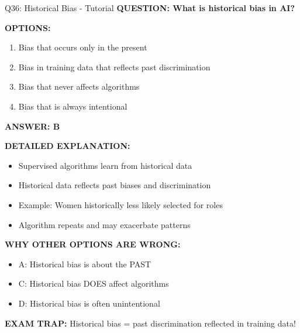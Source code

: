\documentclass[8pt]{beamer}
\begin{document}
	\begin{frame}{Q36: Historical Bias - Tutorial}
		\fontsize{6.5}{7.5}\selectfont
		\textbf{QUESTION: What is historical bias in AI?}
		
		\vspace{0.1cm}
		\textbf{OPTIONS:}
		\begin{enumerate}
			\item Bias that occurs only in the present
			\item Bias in training data that reflects past discrimination
			\item Bias that never affects algorithms
			\item Bias that is always intentional
		\end{enumerate}
		
		\vspace{0.1cm}
		\textcolor{myblue}{\textbf{ANSWER: B}}
		
		\vspace{0.1cm}
		\textbf{DETAILED EXPLANATION:}
		\begin{itemize}
			\item Supervised algorithms learn from historical data
			\item Historical data reflects past biases and discrimination
			\item Example: Women historically less likely selected for roles
			\item Algorithm repeats and may exacerbate patterns
		\end{itemize}
		
		\vspace{0.1cm}
		\textcolor{myred}{\textbf{WHY OTHER OPTIONS ARE WRONG:}}
		\begin{itemize}
			\item \textcolor{myred}{A:} Historical bias is about the PAST
			\item \textcolor{myred}{C:} Historical bias DOES affect algorithms
			\item \textcolor{myred}{D:} Historical bias is often unintentional
		\end{itemize}
		
		\textcolor{myred}{\textbf{EXAM TRAP:}} Historical bias = \textcolor{myblue}{past discrimination reflected in training data}!
	\end{frame}
	
\end{document}
